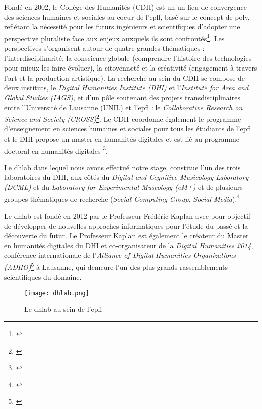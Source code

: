 Fondé en 2002, le Collège des Humanités (CDH) est un  un \og lieu de convergence des sciences humaines et sociales au coeur de l'\gls{epfl}, basé sur le concept de \gls{poly}, reflétant la nécessité pour les futurs ingénieurs et scientifiques d'adopter une perspective pluraliste face aux enjeux auxquels ils sont confrontés\fg{}\footnote{\cite {epfl_vision_nodate}}. Les perspectives s'organisent autour de quatre grandes thématiques : l'interdisciplinarité, la conscience globale (comprendre l'histoire des technologies pour mieux les faire évoluer), la citoyenneté et la créativité (engagement à travers l'art et la production artistique). La recherche au sein du CDH se compose de deux instituts, le \textit{Digital Humanities Institute (DHI)} et l'\textit{Institute for Area and Global Studies (IAGS)}, et d'un pôle soutenant des projets transdisciplinaires entre l'Université de Lausanne (UNIL) et l'\gls{epfl} : le \textit{Collaborative Research on Science and Society (CROSS)}\footnote{\cite {epfl_cross_nodate}}. Le CDH coordonne également le programme d'enseignement en sciences humaines et sociales pour tous les étudiants de l'\gls{epfl} et le DHI propose un master en humanités digitales et est lié au programme doctoral en humanités digitales \footnote{\cite {noauthor_formations_nodate}}.

Le \gls{dhlab} dans lequel nous avons effectué notre stage, constitue l'un des trois laboratoires du DHI, aux côtés du \textit{Digital and Cognitive Musicology Laboratory (DCML)} et du \textit{Laboratory for Experimental Museology (eM+)} et de plusieurs groupes thématiques de recherche (\textit{Social Computing Group},\textit{ Social Media}).\footnote{\cite {epfl.dhlab_dh_nodate}} 

Le \gls{dhlab} est fondé en 2012 par le Professeur Frédéric Kaplan avec pour objectif de développer de nouvelles approches informatiques pour l'étude du passé et la découverte du futur. Le Professeur Kaplan est également le créateur du Master en humanités digitales du DHI et co-organisateur de la \textit{Digital Humanities 2014}, conférence internationale de l'\textit{Alliance of Digital Humanities Organizations (ADHO)}\footnote{\cite {epfl.dhlab_dh_2019}} à Lausanne, qui demeure l'un des plus grands rassemblements scientifiques du domaine. 

\begin{figure}[H]%
\centering
\texttt{[image: dhlab.png]}
\caption{Le \gls{dhlab} au sein de l'\gls{epfl}}
\end{figure}

